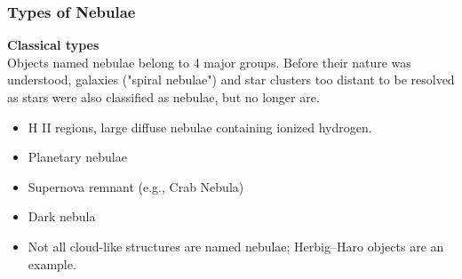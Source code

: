 \documentclass{article}
\begin{document}
\subsubsection{Types of Nebulae}
\textbf{Classical types}\\
    Objects named nebulae belong to 4 major groups. Before their nature was understood, galaxies ("spiral nebulae") and star clusters too distant to be resolved as stars were also classified as nebulae, but no longer are.
    \begin{itemize}
        \item H II regions, large diffuse nebulae containing ionized hydrogen.
        \item Planetary nebulae
        \item Supernova remnant (e.g., Crab Nebula)
        \item Dark nebula
        \item Not all cloud-like structures are named nebulae; Herbig–Haro objects are an example. 
    \end{itemize}
\end{document}
